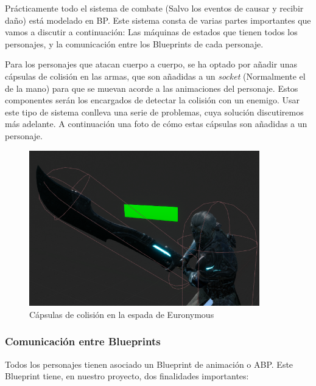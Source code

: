Prácticamente todo el sistema de combate (Salvo los eventos de causar y recibir daño) está modelado en \ac{BP}. Este sistema consta de varias partes importantes que vamos a discutir a continuación: Las máquinas de estados que tienen todos los personajes, y la comunicación entre los Blueprints de cada personaje.


Para los personajes que atacan cuerpo a cuerpo, se ha optado por añadir unas cápsulas de colisión en las armas, que son añadidas a un \textit{socket} (Normalmente el de la mano) para que se muevan acorde a las animaciones del personaje. Estos componentes serán los encargados de detectar la colisión con un enemigo. Usar este tipo de sistema conlleva una serie de problemas, cuya solución discutiremos más adelante. A continuación una foto de cómo estas cápsulas son añadidas a un personaje.


\begin{figure}[H]
  \centering
  \includegraphics[width=10cm]{./images/Eur_Weapon.png}
  \caption{Cápsulas de colisión en la espada de Euronymous}
  \label{HenkkaSM}
\end{figure}


\subsubsection{Comunicación entre Blueprints}

Todos los personajes tienen asociado un Blueprint de animación o \ac{ABP}. Este Blueprint tiene, en nuestro proyecto, dos finalidades importantes:



